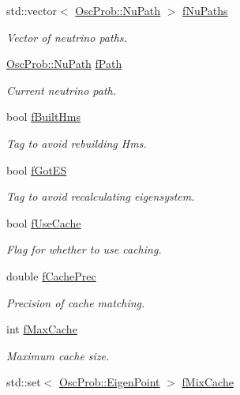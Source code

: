 \begin{DoxyCompactItemize}
std\+::vector$<$ \hyperlink{structOscProb_1_1NuPath}{Osc\+Prob\+::\+Nu\+Path} $>$ \hyperlink{classOscProb_1_1PMNS__Base_a69db9d57e12fc7cbe0431bc6c18fac93}{f\+Nu\+Paths}
\begin{DoxyCompactList}\small\item\em Vector of neutrino paths. \end{DoxyCompactList}\item 
\hyperlink{structOscProb_1_1NuPath}{Osc\+Prob\+::\+Nu\+Path} \hyperlink{classOscProb_1_1PMNS__Base_a849437aa8891fe042e86886ce8f81c6e}{f\+Path}
\begin{DoxyCompactList}\small\item\em Current neutrino path. \end{DoxyCompactList}\item 
bool \hyperlink{classOscProb_1_1PMNS__Base_a9ac3cadeac8db1b90f3152f476244780}{f\+Built\+Hms}
\begin{DoxyCompactList}\small\item\em Tag to avoid rebuilding Hms. \end{DoxyCompactList}\item 
bool \hyperlink{classOscProb_1_1PMNS__Base_a6dc5cd010d2d70b2324745b4e53e9839}{f\+Got\+ES}
\begin{DoxyCompactList}\small\item\em Tag to avoid recalculating eigensystem. \end{DoxyCompactList}\item 
bool \hyperlink{classOscProb_1_1PMNS__Base_ad28c12ef897b5555eda509ea55c99107}{f\+Use\+Cache}
\begin{DoxyCompactList}\small\item\em Flag for whether to use caching. \end{DoxyCompactList}\item 
double \hyperlink{classOscProb_1_1PMNS__Base_a0b4c41a27de281472453a1912cbc1e64}{f\+Cache\+Prec}
\begin{DoxyCompactList}\small\item\em Precision of cache matching. \end{DoxyCompactList}\item 
int \hyperlink{classOscProb_1_1PMNS__Base_a74c13356eafec2490d8c3c19759ba7f0}{f\+Max\+Cache}
\begin{DoxyCompactList}\small\item\em Maximum cache size. \end{DoxyCompactList}\item 
std\+::set$<$ \hyperlink{structOscProb_1_1EigenPoint}{Osc\+Prob\+::\+Eigen\+Point} $>$ \hyperlink{classOscProb_1_1PMNS__Base_a8159424f20197a3a7145fe3bf2c11176}{f\+Mix\+Cache}

\end{DoxyCompactItemize}
